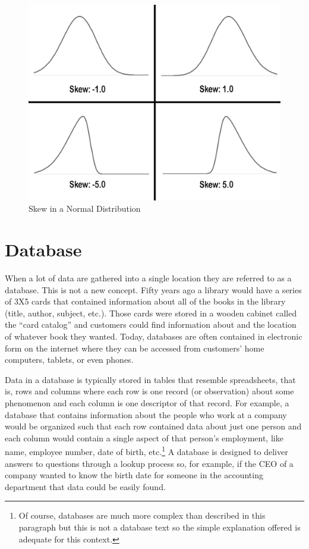 \begin{figure}[H]
	\centering
	\includegraphics[width=\maxwidth{.95\linewidth}]{gfx/06-Skew}
	\caption{Skew in a Normal Distribution}
	\label{fig06.03}
\end{figure}

\section{Database}

When a lot of data are gathered into a single location they are referred to as a \gls{database}. This is not a new concept. Fifty years ago a library would have a series of 3X5 cards that contained information about all of the books in the library (title, author, subject, etc.). Those cards were stored in a wooden cabinet called the ``card catalog'' and customers could find information about and the location of whatever book they wanted. Today, databases are often contained in electronic form on the internet where they can be accessed from customers' home computers, tablets, or even phones.

Data in a database is typically stored in tables that resemble spreadsheets, that is, rows and columns where each row is one record (or observation) about some phenomenon and each column is one descriptor of that record. For example, a database that contains information about the people who work at a company would be organized such that each row contained data about just one person and each column would contain a single aspect of that person's employment, like name, employee number, date of birth, etc.\footnote{Of course, databases are much more complex than described in this paragraph but this is not a database text so the simple explanation offered is adequate for this context.} A database is designed to deliver answers to questions through a lookup process so, for example, if the CEO of a company wanted to know the birth date for someone in the accounting department that data could be easily found. 

